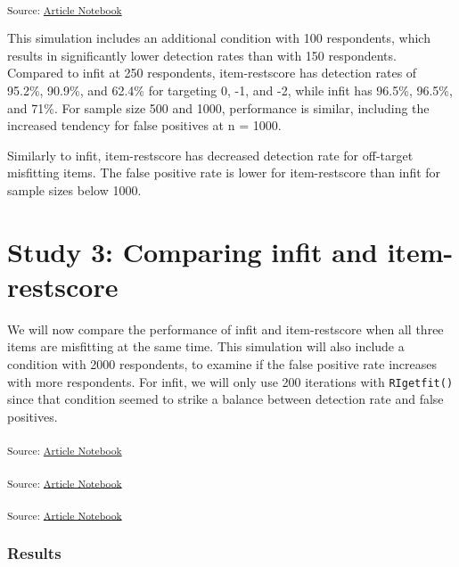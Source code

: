 \documentclass[
  letterpaper,
  DIV=11,
  numbers=noendperiod]{scrartcl}
\begin{document}
\textsubscript{Source:
\href{https://pgmj.github.io/rasch_itemfit/index.qmd.html}{Article
Notebook}}

This simulation includes an additional condition with 100 respondents,
which results in significantly lower detection rates than with 150
respondents. Compared to infit at 250 respondents, item-restscore has
detection rates of 95.2\%, 90.9\%, and 62.4\% for targeting 0, -1, and
-2, while infit has 96.5\%, 96.5\%, and 71\%. For sample size 500 and
1000, performance is similar, including the increased tendency for false
positives at n = 1000.

Similarly to infit, item-restscore has decreased detection rate for
off-target misfitting items. The false positive rate is lower for
item-restscore than infit for sample sizes below 1000.

\section{Study 3: Comparing infit and
item-restscore}\label{study-3-comparing-infit-and-item-restscore}

We will now compare the performance of infit and item-restscore when all
three items are misfitting at the same time. This simulation will also
include a condition with 2000 respondents, to examine if the false
positive rate increases with more respondents. For infit, we will only
use 200 iterations with \texttt{RIgetfit()} since that condition seemed
to strike a balance between detection rate and false positives.

\textsubscript{Source:
\href{https://pgmj.github.io/rasch_itemfit/index.qmd.html}{Article
Notebook}}

\textsubscript{Source:
\href{https://pgmj.github.io/rasch_itemfit/index.qmd.html}{Article
Notebook}}

\textsubscript{Source:
\href{https://pgmj.github.io/rasch_itemfit/index.qmd.html}{Article
Notebook}}

\subsubsection{Results}\label{results-2}
\end{document}
